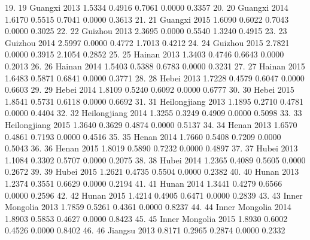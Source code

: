 19. {\VBAR}  19          Guangxi   2013   1.5334   0.4916   0.7061   0.0000   0.3357 {\VBAR}
20. {\VBAR}  20          Guangxi   2014   1.6170   0.5515   0.7041   0.0000   0.3613 {\VBAR}
21. {\VBAR}  21          Guangxi   2015   1.6090   0.6022   0.7043   0.0000   0.3025 {\VBAR}
22. {\VBAR}  22          Guizhou   2013   2.3695   0.0000   0.5540   1.3240   0.4915 {\VBAR}
23. {\VBAR}  23          Guizhou   2014   2.5997   0.0000   0.4772   1.7013   0.4212 {\VBAR}
24. {\VBAR}  24          Guizhou   2015   2.7821   0.0000   0.3915   2.1054   0.2852 {\VBAR}
25. {\VBAR}  25           Hainan   2013   1.3403   0.4746   0.6643   0.0000   0.2013 {\VBAR}
26. {\VBAR}  26           Hainan   2014   1.5403   0.5388   0.6783   0.0000   0.3231 {\VBAR}
27. {\VBAR}  27           Hainan   2015   1.6483   0.5871   0.6841   0.0000   0.3771 {\VBAR}
28. {\VBAR}  28            Hebei   2013   1.7228   0.4579   0.6047   0.0000   0.6603 {\VBAR}
29. {\VBAR}  29            Hebei   2014   1.8109   0.5240   0.6092   0.0000   0.6777 {\VBAR}
30. {\VBAR}  30            Hebei   2015   1.8541   0.5731   0.6118   0.0000   0.6692 {\VBAR}
31. {\VBAR}  31     Heilongjiang   2013   1.1895   0.2710   0.4781   0.0000   0.4404 {\VBAR}
32. {\VBAR}  32     Heilongjiang   2014   1.3255   0.3249   0.4909   0.0000   0.5098 {\VBAR}
33. {\VBAR}  33     Heilongjiang   2015   1.3640   0.3629   0.4874   0.0000   0.5137 {\VBAR}
34. {\VBAR}  34            Henan   2013   1.6570   0.4861   0.7193   0.0000   0.4516 {\VBAR}
35. {\VBAR}  35            Henan   2014   1.7660   0.5408   0.7209   0.0000   0.5043 {\VBAR}
36. {\VBAR}  36            Henan   2015   1.8019   0.5890   0.7232   0.0000   0.4897 {\VBAR}
37. {\VBAR}  37            Hubei   2013   1.1084   0.3302   0.5707   0.0000   0.2075 {\VBAR}
38. {\VBAR}  38            Hubei   2014   1.2365   0.4089   0.5605   0.0000   0.2672 {\VBAR}
39. {\VBAR}  39            Hubei   2015   1.2621   0.4735   0.5504   0.0000   0.2382 {\VBAR}
40. {\VBAR}  40            Hunan   2013   1.2374   0.3551   0.6629   0.0000   0.2194 {\VBAR}
41. {\VBAR}  41            Hunan   2014   1.3441   0.4279   0.6566   0.0000   0.2596 {\VBAR}
42. {\VBAR}  42            Hunan   2015   1.4214   0.4905   0.6471   0.0000   0.2839 {\VBAR}
43. {\VBAR}  43   Inner Mongolia   2013   1.7859   0.5261   0.4361   0.0000   0.8237 {\VBAR}
44. {\VBAR}  44   Inner Mongolia   2014   1.8903   0.5853   0.4627   0.0000   0.8423 {\VBAR}
45. {\VBAR}  45   Inner Mongolia   2015   1.8930   0.6002   0.4526   0.0000   0.8402 {\VBAR}
46. {\VBAR}  46          Jiangsu   2013   0.8171   0.2965   0.2874   0.0000   0.2332 {\VBAR}
